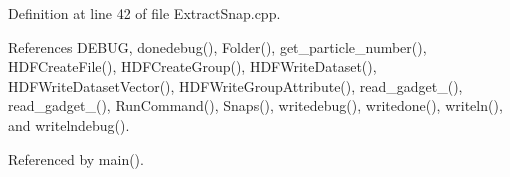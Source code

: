 Definition at line 42 of file ExtractSnap.cpp.



References DEBUG, donedebug(), Folder(), get\_\-particle\_\-number(), HDFCreateFile(), HDFCreateGroup(), HDFWriteDataset(), HDFWriteDatasetVector(), HDFWriteGroupAttribute(), read\_\-gadget\_(), read\_\-gadget\_(), RunCommand(), Snaps(), writedebug(), writedone(), writeln(), and writelndebug().



Referenced by main().

